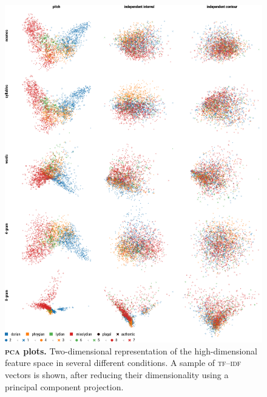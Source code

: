 \documentclass{article}
\begin{document}
\begin{figure}
    \centering
    \includegraphics{figs/figS09-PCA-embeddings.pdf}
    \caption{
        \textbf{\textsc{pca} plots.}
        Two-dimensional representation of the high-dimensional feature space
        in several different conditions.
        A sample of \textsc{tf--idf} vectors is shown, after reducing their dimensionality using a principal component projection.
        \label{suppl:pca-plots}
    }
\end{figure}
\end{document}

